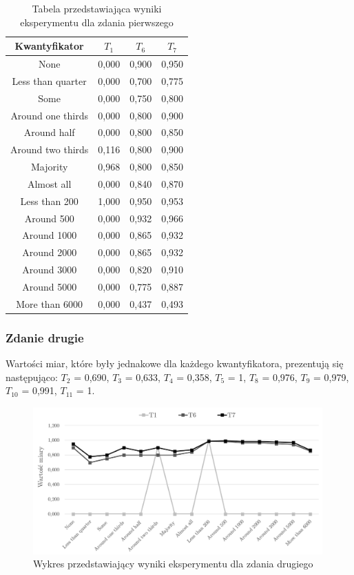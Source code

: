 \documentclass{classrep}
\begin{document}
\begin{table}[H]
	\centering
	\begin{tabular}{c c c c} 
		\hline
		\textbf{Kwantyfikator}  & \textbf{$T_1$} & \textbf{$T_6$} & \textbf{$T_7$}\\ [0.5ex] 
		\hline
None	&	0,000	&	0,900	&	0,950	\\
Less than quarter	&	0,000	&	0,700	&	0,775	\\
Some 	&	0,000	&	0,750	&	0,800	\\
Around one thirds 	&	0,000	&	0,800	&	0,900	\\
Around half 	&	0,000	&	0,800	&	0,850	\\
Around two thirds 	&	0,116	&	0,800	&	0,900	\\
Majority 	&	0,968	&	0,800	&	0,850	\\
Almost all	&	0,000	&	0,840	&	0,870	\\
Less than 200	&	1,000	&	0,950	&	0,953	\\
Around 500	&	0,000	&	0,932	&	0,966	\\
Around 1000	&	0,000	&	0,865	&	0,932	\\
Around 2000	&	0,000	&	0,865	&	0,932	\\
Around 3000	&	0,000	&	0,820	&	0,910	\\
Around 5000	&	0,000	&	0,775	&	0,887	\\
More than 6000	&	0,000	&	0,437	&	0,493	\\
		\hline
	\end{tabular}
	\caption{Tabela przedstawiająca wyniki eksperymentu dla zdania pierwszego}
\end{table}

\clearpage



\subsubsection{Zdanie drugie}

Wartości miar, które były jednakowe dla każdego kwantyfikatora, prezentują się następująco:
$T_2$ = 0,690, $T_3$ = 0,633, $T_4$ = 0,358, $T_5$ = 1, $T_8$ = 0,976, $T_9$ = 0,979, $T_{10}$ = 0,991, $T_{11}$ = 1.

\begin{figure}[H]
	\centering
	\includegraphics[width=0.99\textwidth]{Pictures/ResultCharts/Eks1_2.png}
	\caption{Wykres przedstawiający wyniki eksperymentu dla zdania drugiego}
\end{figure}
\end{document}
